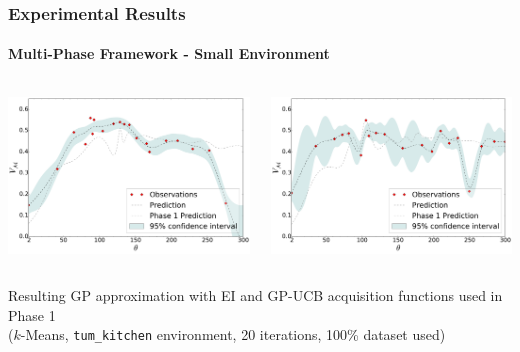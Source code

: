 \begin{frame}
	\frametitle{Experimental Results}
	\framesubtitle{Multi-Phase Framework - Small Environment}
	\vspace{10pt}
	\begin{columns}
		\begin{column}{0.5\textwidth}
			\includegraphics[width=\linewidth]{../../figures/plots/tum_multi/plot_b_00__alg_kmeans_pct_100_acq_ei}
		\end{column}
		\begin{column}{0.5\textwidth}
			\includegraphics[width=\linewidth]{../../figures/plots/tum_multi/plot_b_00__alg_kmeans_pct_100_acq_ucb}
		\end{column}
	\end{columns}
	\begin{center}
		\footnotesize
		Resulting GP approximation with EI and GP-UCB acquisition functions used in Phase 1\\
		($k$-Means, \texttt{tum\_kitchen} environment, 20 iterations, 100\% dataset used)
	\end{center}
\end{frame}

